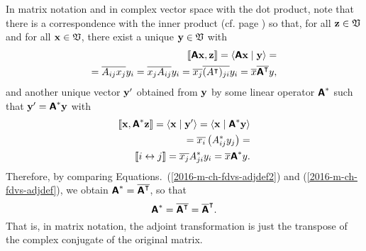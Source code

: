 In matrix notation and in complex vector space with the dot product,
note that there is a correspondence with the inner product
(cf. page \pageref{2011-m-corr-bil-ip})
so that, for all ${\bf z}\in {\frak V}$ and for all ${\bf x}\in {\frak V}$,
there exist a unique ${\bf y}\in {\frak V}$ with
\begin{equation}
\begin{split}
\llbracket \textsf{\textbf{A}}{\bf x}, {\bf z}\rrbracket
=\langle \textsf{\textbf{A}} {\bf x}\mid {\bf y}\rangle
= \\
=\overline{A_{ij}   x_j}  y_i
=  \overline{x_j A_{ij}} y_i
= \overline{x_j} \overline{(A^\intercal )_{ji}}  y_i
= \overline{ x}  \overline{ \textsf{\textbf{A}}^\intercal}  y ,
\end{split}
\label{2016-m-ch-fdvs-adjdef}
\end{equation}
and another unique vector ${\bf y}'$ obtained from ${\bf y}$ by
some linear operator $\textsf{\textbf{A}}^\ast$
such that ${\bf y}'=\textsf{\textbf{A}}^\ast {\bf y}$ with
\begin{equation}
\begin{split}
\llbracket {\bf x}, \textsf{\textbf{A}}^\ast {\bf z}\rrbracket
= \langle {\bf x}\mid {\bf y}'\rangle
= \langle {\bf x}\mid \textsf{\textbf{A}}^\ast {\bf y}\rangle
 \\
= \overline{ x_i } \left(A_{ij}^\ast y_j \right)
=\\
\llbracket  i \leftrightarrow j\rrbracket
= \overline{  x_j }A_{ji}^\ast    y_i
=   \overline{ x }\textsf{\textbf{A}}^\ast y.
\end{split}
\label{2016-m-ch-fdvs-adjdef2}
\end{equation}
Therefore, by comparing Equations.~(\ref{2016-m-ch-fdvs-adjdef2}) and (\ref{2016-m-ch-fdvs-adjdef}),  we obtain $\textsf{\textbf{A}}^\ast=\overline{ \textsf{\textbf{A}}^\intercal }$, so that
\begin{equation}
\textsf{\textbf{A}}^\ast =\overline{\textsf{\textbf{A}}^\intercal } = \overline{\textsf{\textbf{A}}}^\intercal .
\end{equation}
That is, in matrix notation, the adjoint transformation is just the
transpose of the complex conjugate of the original matrix.

